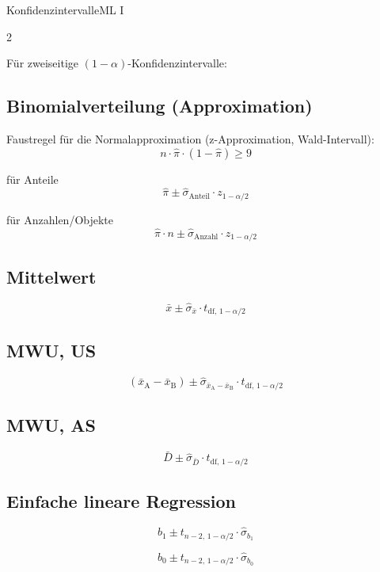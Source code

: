 
\begin{formulaBox}{Konfidenzintervalle}{ML I}

\begin{multicols}{2}

Für zweiseitige $(1-\alpha)$-Konfidenzintervalle:

\subsection*{Binomialverteilung (Approximation)}
Faustregel für die Normalapproximation (z-Approximation, Wald-Intervall):
\[
n \cdot \hat{\pi} \cdot (1-\hat{\pi})\geq9
\]

für Anteile
$$\hat{\pi} \pm \hat{\sigma}_{\mathrm{Anteil}}\cdot z_{1-\alpha/2}$$

für Anzahlen/Objekte
$$\hat{\pi} \cdot n \pm \hat{\sigma}_{\mathrm{Anzahl}}\cdot z_{1-\alpha/2}$$

\subsection*{Mittelwert} 
$$\bar{x} \pm \hat{\sigma}_{\bar{x}} \cdot t_{\mathrm{df},\,1-\alpha/2}$$

\subsection*{MWU, US} 
$$(\bar{x}_\mathrm{A}-\bar{x}_\mathrm{B}) \pm \hat{\sigma}_{\bar{x}_\mathrm{A}-\bar{x}_\mathrm{B}}\cdot t_{\mathrm{df},\,1-\alpha/2}$$

\subsection*{MWU, AS}
$${\bar{D}} \pm \hat{\sigma}_{\bar{D}}\cdot t_{\mathrm{df},\,1-\alpha/2}$$

\subsection*{Einfache lineare Regression}
\[
b_1
\pm
t_{n-2,\,1-\alpha/2}
\cdot\hat{\sigma}_{b_1}
\]

\[
b_0
\pm
t_{n-2,\,1-\alpha/2}
\cdot \hat{\sigma}_{b_0}
\]

\end{multicols}


\end{formulaBox}
